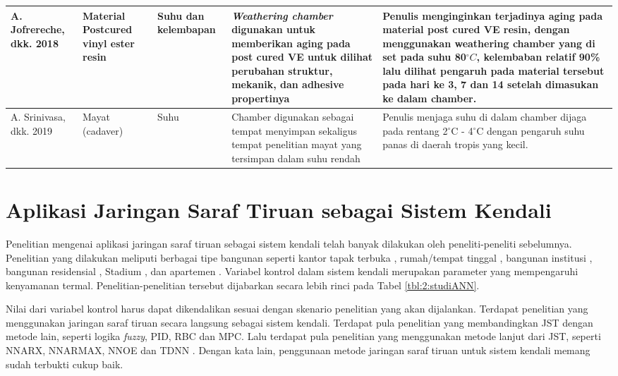 \begin{landscape}
\begin{table}[hbt!]
\begin{tabular}{|p{1.6cm}|p{2.3cm}|p{1.7cm}|p{7.3cm}|p{9cm}|}
			A. Jofrereche, dkk. 2018 \cite{article8} & Material Postcured vinyl ester resin & Suhu dan kelembapan & \textit{Weathering chamber} digunakan untuk memberikan aging pada post cured VE untuk dilihat perubahan struktur, mekanik, dan adhesive propertinya & Penulis menginginkan terjadinya aging pada material post cured VE resin, dengan menggunakan weathering chamber yang di set pada suhu 80$^{\circ}C$, kelembaban relatif 90\% lalu dilihat pengaruh pada material tersebut pada hari ke 3, 7 dan 14 setelah dimasukan ke dalam chamber. \\ \hline
			
			A. Srinivasa, dkk. 2019 \cite{article9} & Mayat (cadaver) & Suhu & Chamber digunakan sebagai tempat menyimpan sekaligus tempat penelitian mayat yang tersimpan dalam suhu rendah & Penulis menjaga suhu di dalam chamber dijaga pada rentang 2$^{\circ}$C - 4$^{\circ}$C dengan pengaruh suhu panas di daerah tropis yang kecil. \\ \hline
		\end{tabular}
	\end{table}
\end{landscape}

\section{Aplikasi Jaringan Saraf Tiruan sebagai Sistem Kendali}

Penelitian mengenai aplikasi jaringan saraf tiruan sebagai sistem kendali telah banyak dilakukan oleh peneliti-peneliti sebelumnya. Penelitian yang dilakukan meliputi berbagai tipe bangunan seperti kantor tapak terbuka \cite{article11}, rumah/tempat tinggal \cite{article12}\cite{article13}, bangunan institusi \cite{article14}, bangunan residensial \cite{article15}, Stadium \cite{article16}, dan apartemen \cite{article17}. Variabel kontrol dalam sistem kendali merupakan parameter yang mempengaruhi kenyamanan termal. Penelitian-penelitian tersebut dijabarkan secara lebih rinci pada Tabel \ref{tbl:2:studiANN}.

Nilai dari variabel kontrol harus dapat dikendalikan sesuai dengan skenario penelitian yang akan dijalankan. Terdapat penelitian yang menggunakan jaringan saraf tiruan secara langsung sebagai sistem kendali. Terdapat pula penelitian yang membandingkan JST dengan metode lain, seperti logika \textit{fuzzy}, PID, RBC dan MPC. Lalu terdapat pula penelitian yang menggunakan metode lanjut dari JST, seperti NNARX, NNARMAX, NNOE \cite{article11} dan TDNN \cite{article15}. Dengan kata lain, penggunaan metode jaringan saraf tiruan untuk sistem kendali memang sudah terbukti cukup baik.


